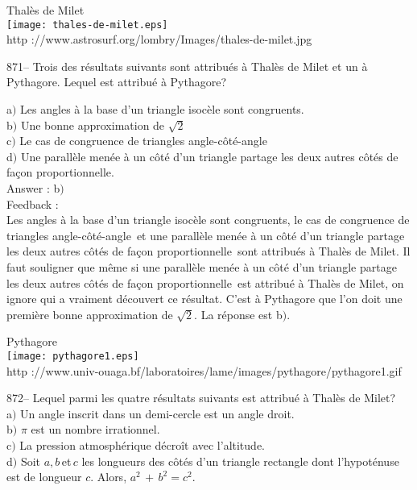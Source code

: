 ﻿\documentclass[letterpaper, 12pt]{article}
\begin{document}
        \begin{center}
        Thal\`es de Milet\\
    \texttt{[image: thales-de-milet.eps]}\\
        {\footnotesize http
://www.astrosurf.org/lombry/Images/thales-de-milet.jpg}
    \end{center}

871-- Trois des r\'esultats suivants sont attribu\'es \`a Thal\`es
de Milet et un \`a Pythagore. Lequel est attribu\'e \`a Pythagore?

a$)$ Les angles \`a la base d'un triangle isoc\`ele sont congruents. \\
b$)$ Une bonne approximation de $\sqrt2$ \\
c$)$ Le cas de congruence de triangles angle-c\^ot\'e-angle \\
d$)$ Une parall\`ele men\'ee \`a un c\^ot\'e d'un triangle partage les deux
autres c\^ot\'es de fa\c con proportionnelle. \\

Answer : b$)$\\

Feedback : \\
\og Les angles \`a la base d'un triangle isoc\`ele sont
congruents\fg , \og le cas de congruence de triangles
angle-c\^ot\'e-angle\fg\ et \og une parall\`ele men\'ee \`a un
c\^ot\'e d'un triangle partage les deux autres c\^ot\'es de fa\c con
proportionnelle\fg\ sont attribu\'es \`a Thal\`es de Milet.  Il faut
souligner que m\^eme si \og une parall\`ele men\'ee \`a un c\^ot\'e
d'un triangle partage les deux autres c\^ot\'es de fa\c con
proportionnelle\fg\ est attribu\'e \`a Thal\`es de Milet, on ignore
qui a vraiment d\'ecouvert ce r\'esultat. C'est \`a Pythagore que
l'on doit une premi\`ere bonne approximation de $\sqrt2$. La
r\'eponse est b$)$.

        \begin{center}
        Pythagore\\
    \texttt{[image: pythagore1.eps]}\\
        {\footnotesize http
://www.univ-ouaga.bf/laboratoires/lame/images/pythagore/pythagore1.gif}
    \end{center}

872-- Lequel parmi les quatre r\'esultats suivants est attribu\'e \`a
Thal\`es de Milet?\\

a$)$ Un angle inscrit dans un demi-cercle est un angle droit. \\
b$)$ $\pi$ est un nombre irrationnel. \\
c$)$ La pression atmosph\'erique d\'ecro\^it avec l'altitude. \\
d$)$ Soit $a,b\,$et$\,c$ les longueurs des c\^ot\'es d'un triangle rectangle
dont l'hypot\'enuse est de longueur $c$.  Alors, $a^2\,+\,b^2=c^2$.\\
\end{document}
